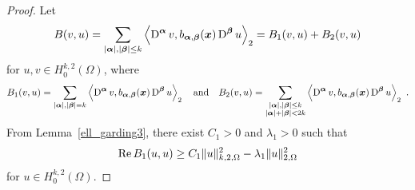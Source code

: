 \begin{proof}
Let
\[
B(v,u) = \sum_{|{\bm{\alpha}}|,|{\bm{\beta}}|\leq k}
\left\langle{\operatorname{D}^{{\bm{\alpha}}} v} , {b_{{\bm{\alpha}},{\bm{\beta}}}({\bm{x}})
\operatorname{D}^{{\bm{\beta}}} u}\right\rangle_2  = B_1(v,u) + B_2(v,u)
\]
for $\displaystyle u, v \in H^{k,2}_0(\Omega)$, where
\[
B_1(v,u) = \sum_{|{\bm{\alpha}}|,|{\bm{\beta}}|= k}
\left\langle{\operatorname{D}^{{\bm{\alpha}}} v} , {b_{{\bm{\alpha}},{\bm{\beta}}}({\bm{x}})
\operatorname{D}^{{\bm{\beta}}} u}\right\rangle_2
\quad \text{and} \quad
B_2(v,u) = \sum_{\substack{|{\bm{\alpha}}|,|{\bm{\beta}}|\leq k\\
|{\bm{\alpha}}|+|{\bm{\beta}}|<2k}}
\left\langle{\operatorname{D}^{{\bm{\alpha}}} v} , {b_{{\bm{\alpha}},{\bm{\beta}}}({\bm{x}})
\operatorname{D}^{{\bm{\beta}}} u}\right\rangle_2 \ .
\]
From Lemma~\ref{ell_garding3}, there exist $C_1>0$ and $\lambda_1 >0$
such that
\begin{equation} \label{ell_garding_idx6}
\operatorname{Re} B_1(u,u) \geq C_1\|u\|_{k,2,\Omega}^2 - \lambda_1 \|u\|_{2,\Omega}^2
\end{equation}
for $\displaystyle u \in H^{k,2}_0(\Omega)$.


\end{proof}

